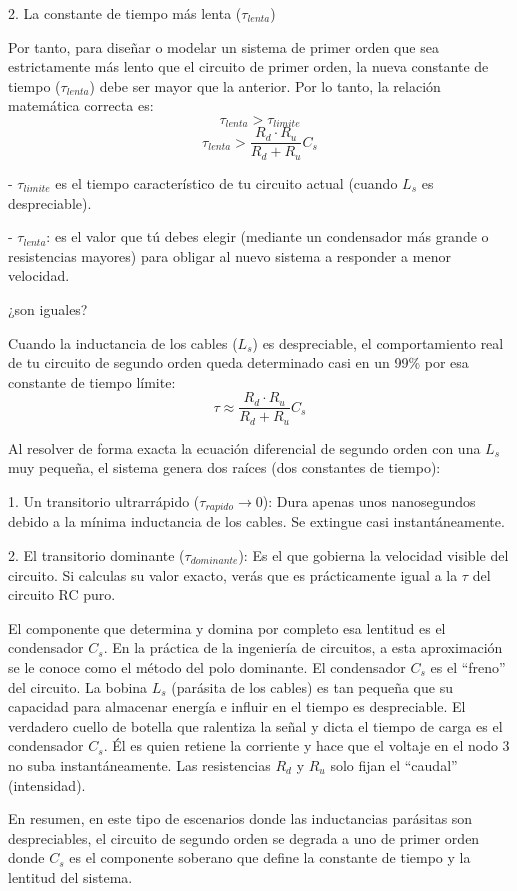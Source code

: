 \documentclass[11pt, a4paper]{article}
\theoremstyle{definition}
\theoremstyle{plain}
\theoremstyle{plain}
\theoremstyle{remark}
\theoremstyle{remark}
\theoremstyle{remark}
\begin{document}
2. La constante de tiempo más lenta ($\tau_{lenta}$)

Por tanto, para diseñar o modelar un sistema de primer orden que sea estrictamente más lento que el circuito de primer orden, la nueva constante de tiempo ($\tau_{lenta}$) debe ser mayor que la anterior. Por lo tanto, la relación matemática correcta es:
$$\tau_{lenta} > \tau_{limite}$$ 
$$\tau_{lenta} > \frac{R_d \cdot R_u}{R_d + R_u} C_s$$ 



- $\tau_{limite}$  es el tiempo característico de tu circuito actual (cuando $L_s$ es despreciable).

- $\tau_{lenta}$: es el valor que tú debes elegir (mediante un condensador más grande o resistencias mayores) para obligar al nuevo sistema a responder a menor velocidad.

¿son iguales?


Cuando la inductancia de los cables ($L_s$) es despreciable, el comportamiento real de tu circuito de segundo orden queda determinado casi en un 99\% por esa constante de tiempo límite:
$$\tau \approx \frac{R_d \cdot R_u}{R_d + R_u} C_s$$ 

Al resolver de forma exacta la ecuación diferencial de segundo orden con una $L_s$ muy pequeña, el sistema genera dos raíces (dos constantes de tiempo):

1. Un transitorio ultrarrápido ($\tau_{rapido} \to 0$): Dura apenas unos nanosegundos debido a la mínima inductancia de los cables. Se extingue casi instantáneamente.

2. El transitorio dominante ($\tau_{dominante}$): Es el que gobierna la velocidad visible del circuito. Si calculas su valor exacto, verás que es prácticamente igual a la $\tau$ del circuito RC puro.

El componente que determina y domina por completo esa lentitud es el condensador $C_s$. En la práctica de la ingeniería de circuitos, a esta aproximación se le conoce como el método del polo dominante. El condensador $C_s$ es el ``freno'' del circuito. La bobina $L_s$ (parásita de los cables) es tan pequeña que su capacidad para almacenar energía e influir en el tiempo es despreciable. El verdadero cuello de botella que ralentiza la señal y dicta el tiempo de carga es el condensador $C_s$. Él es quien retiene la corriente y hace que el voltaje en el nodo 3 no suba instantáneamente. Las resistencias $R_d$ y $R_u$ solo fijan el ``caudal'' (intensidad).


En resumen, {\color{red} en este tipo de escenarios donde las inductancias parásitas son despreciables, el circuito de segundo orden se degrada a uno de primer orden donde $C_s$ es el componente soberano} que define la constante de tiempo y la lentitud del sistema.
\end{document}
